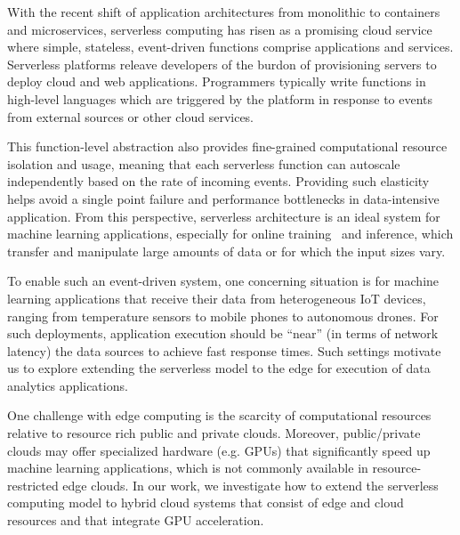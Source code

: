 With the recent shift of application architectures from monolithic to containers and microservices, serverless computing has risen as a promising cloud service where simple, stateless, 
event-driven functions comprise applications and services. 
Serverless platforms releave
developers of the burdon of provisioning servers to deploy 
cloud and web applications.
Programmers typically write functions in high-level languages which are triggered by the platform in response to events from external sources or other cloud services. 

This function-level abstraction also provides fine-grained computational resource isolation and usage, meaning that each serverless function can autoscale independently based on the rate of incoming events. Providing such elasticity helps avoid a single point failure and performance bottlenecks in data-intensive application. From this perspective, serverless architecture is an ideal system for machine learning applications, especially for online training~\cite{ref:online} and inference, which transfer and manipulate large amounts of data or for 
which the input sizes vary.

To enable such an event-driven system, one concerning situation is for machine learning applications that receive their data from  heterogeneous IoT devices, ranging from temperature sensors to mobile phones to autonomous drones. For such deployments, application execution should be ``near'' (in terms of network latency) the data sources to achieve fast response times. Such settings
motivate us to explore extending the serverless model to the edge for execution of data analytics applications.

One challenge with edge computing is the scarcity of computational resources relative to resource rich public and private clouds.  Moreover, public/private clouds may offer specialized hardware (e.g. GPUs) that significantly speed 
up machine learning applications, which is not commonly available 
in resource-restricted edge clouds.
In our work, we investigate how to extend the serverless computing model
to hybrid cloud systems that consist of edge and cloud resources and that
integrate GPU acceleration. 

